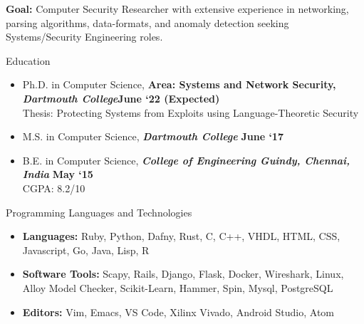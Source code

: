 \documentclass[]{mcdowellcv}
\begin{document}
	\makeheader
\vspace{0.5cm}
\textbf{\color{dartmouthgreencompl}Goal:} Computer Security Researcher with extensive experience in networking, parsing algorithms, data-formats, and anomaly detection seeking Systems/Security Engineering roles.

 \begin{cvsection}{Education}
		\begin{cvsubsection}
{}{}{}
			\begin{itemize}
				\item Ph.D. in Computer Science, \textbf{Area: Systems and Network Security, \textit{\color{dartmouthgreen}  Dartmouth College}}\mbox{}\hfill \textbf{June `22 (Expected)}\\
        Thesis: Protecting Systems from Exploits using Language-Theoretic Security
				\item M.S. in Computer Science, \textbf{\textit{\color{dartmouthgreen} Dartmouth College}} \mbox{}\hfill\textbf{June `17} 
				\item B.E. in Computer Science, \textbf{\textit{\color{dartmouthgreen} College of Engineering Guindy, Chennai, India}} \mbox{} \hfill \textbf{May `15} \\ CGPA: 8.2/10
              
			
			
			\end{itemize}
		\end{cvsubsection}
	\end{cvsection}
    	\begin{cvsection}{Programming Languages and Technologies}
		\begin{cvsubsection}{}{}{}	
			\begin{itemize}
				\item  \textbf{\color{dartmouthgreencompl}Languages:} Ruby, Python, Dafny, Rust, C, C++, VHDL, HTML, CSS, Javascript, Go, Java, Lisp, R
				\item  \textbf{\color{dartmouthgreencompl}Software Tools:} Scapy, Rails, Django, Flask, Docker, Wireshark, Linux, Alloy Model Checker, Scikit-Learn, Hammer, Spin, Mysql, PostgreSQL
        \item \textbf{\color{dartmouthgreencompl}Editors:} Vim, Emacs, VS Code, Xilinx Vivado, Android Studio, Atom
			\end{itemize}
		\end{cvsubsection}
	\end{cvsection}	
\end{document}
